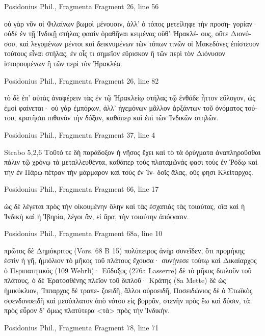 \documentclass[12pt,letterpaper,twoside,final]{memoir}
\begin{document}
\begin{greek}
Posidonius Phil., Fragmenta 
Fragment 26, line 56

                                                                                 οὐ 
γὰρ νῦν οἱ Φιλαίνων βωμοὶ μένουσιν, ἀλλ' ὁ τόπος μετείληφε τὴν προση-
γορίαν· οὐδὲ ἐν τῇ Ἰνδικῇ στήλας φασὶν ὁραθῆναι κειμένας οὔθ' Ἡρακλέ-
ους, οὔτε Διονύσου, καὶ λεγομένων μέντοι καὶ δεικνυμένων τῶν τόπων   
τινῶν οἱ Μακεδόνες ἐπίστευον τούτους εἶναι στήλας, ἐν οἷς τι σημεῖον 
εὕρισκον ἢ τῶν περὶ τὸν Διόνυσον ἱστορουμένων ἢ τῶν περὶ τὸν Ἡρακλέα. 



Posidonius Phil., Fragmenta 
Fragment 26, line 82

                                                                  τὸ δὲ ἐπ' αὐτὰς 
ἀναφέρειν τὰς ἐν τῷ Ἡρακλείῳ στήλας τῷ ἐνθάδε ἧττον εὔλογον, ὡς 
ἐμοὶ φαίνεται· οὐ γὰρ ἐμπόρων, ἀλλ' ἡγεμόνων μᾶλλον ἀρξάντων τοῦ 
ὀνόματος τούτου, κρατῆσαι πιθανὸν τὴν δόξαν, καθάπερ καὶ ἐπὶ τῶν 
Ἰνδικῶν στηλῶν. 



Posidonius Phil., Fragmenta 
Fragment 37, line 4

Strabo 5,2,6 
Τοῦτό τε δὴ παράδοξον ἡ νῆσος ἔχει καὶ τὸ τὰ ὀρύγματα ἀναπληροῦσθαι 
πάλιν τῷ χρόνῳ τὰ μεταλλευθέντα, καθάπερ τοὺς πλαταμῶνάς φασι 
τοὺς ἐν Ῥόδῳ καὶ τὴν ἐν Πάρῳ πέτραν τὴν μάρμαρον καὶ τοὺς ἐν Ἰν-
δοῖς ἅλας, οὕς φησι Κλείταρχος. 



Posidonius Phil., Fragmenta 
Fragment 66, line 17

                                ὡς δὲ λέγεται πρὸς τὴν οἰκουμένην ὅλην καὶ 
τὰς ἐσχατιὰς τὰς τοιαύτας, οἵα καὶ ἡ Ἰνδικὴ καὶ ἡ Ἰβηρία, λέγοι ἄν, 
εἰ ἄρα, τὴν τοιαύτην ἀπόφασιν. 



Posidonius Phil., Fragmenta 
Fragment 68a, line 10

      πρῶτος δὲ Δημόκριτος (Vors. 68 B 15) πολύπειρος ἀνὴρ συνεῖδεν, 
ὅτι προμήκης ἐστὶν ἡ γῆ, ἡμιόλιον τὸ μῆκος τοῦ πλάτους ἔχουσα· συνῄνεσε 
τούτῳ καὶ Δικαίαρχος ὁ Περιπατητικός (109 Wehrli)· Εὔδοξος (276a 
Lasserre) δὲ τὸ μῆκος διπλοῦν τοῦ πλάτους, ὁ δὲ Ἐρατοσθένης πλεῖον 
τοῦ διπλοῦ· Κράτης (8a Mette) δὲ ὡς ἡμικύκλιον, Ἵππαρχος δὲ τραπε-
ζοειδῆ, ἄλλοι οὐροειδῆ, Ποσειδώνιος δὲ ὁ Στωϊκὸς σφενδονοειδῆ καὶ   
μεσόπλατον ἀπὸ νότου εἰς βορρᾶν, στενὴν πρὸς ἕω καὶ δύσιν, τὰ πρὸς 
εὖρον δ' ὅμως πλατύτερα <τὰ> πρὸς τὴν Ἰνδικήν. 



Posidonius Phil., Fragmenta 
Fragment 78, line 71


\end{greek}
\end{document}
